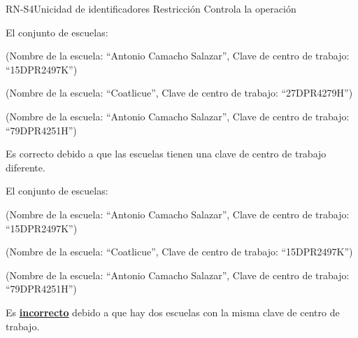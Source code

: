 \begin{BusinessRule}{RN-S4}{Unicidad de identificadores}
	{Restricción}
	{Controla la operación}
	\item[Ejemplo de cumplimiento:] El conjunto de escuelas:
		\begin{Citemize}
			\item (Nombre de la escuela: ``Antonio Camacho Salazar'', Clave de centro de trabajo: ``15DPR2497K'')
			\item (Nombre de la escuela: ``Coatlicue'', Clave de centro de trabajo: ``27DPR4279H'')
			\item (Nombre de la escuela: ``Antonio Camacho Salazar'', Clave de centro de trabajo: ``79DPR4251H'')
		\end{Citemize}
		Es correcto debido a que las escuelas tienen una clave de centro de trabajo diferente.
		\item[Ejemplo de fallo:] El conjunto de escuelas:    
		\begin{Citemize}
			\item (Nombre de la escuela: ``Antonio Camacho Salazar'', Clave de centro de trabajo: ``15DPR2497K'')
			\item (Nombre de la escuela: ``Coatlicue'', Clave de centro de trabajo: ``15DPR2497K'')
			\item (Nombre de la escuela: ``Antonio Camacho Salazar'', Clave de centro de trabajo: ``79DPR4251H'')
		\end{Citemize}
		Es {\bf \underline{incorrecto}} debido a que hay dos escuelas con la misma clave de centro de trabajo.
\end{BusinessRule}

